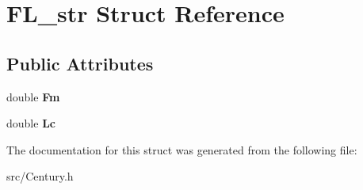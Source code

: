 \hypertarget{struct_f_l__str}{\section{F\-L\-\_\-str Struct Reference}
\label{struct_f_l__str}
}
\subsection*{Public Attributes}
\begin{DoxyCompactItemize}
\item 
\hypertarget{struct_f_l__str_aea2eb41638cfaaf3d1042d9c7a16e28a}{double {\bfseries Fm}}\label{struct_f_l__str_aea2eb41638cfaaf3d1042d9c7a16e28a}

\item 
\hypertarget{struct_f_l__str_a0a1b85271a3e56ce143aaf040b84807d}{double {\bfseries Lc}}\label{struct_f_l__str_a0a1b85271a3e56ce143aaf040b84807d}

\end{DoxyCompactItemize}


The documentation for this struct was generated from the following file\-:\begin{DoxyCompactItemize}
\item 
src/Century.\-h\end{DoxyCompactItemize}
